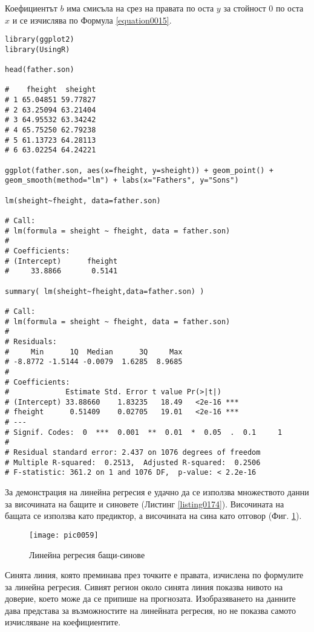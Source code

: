 Коефициентът $b$ има смисъла на срез на правата по оста $y$ за стойност 0 по оста $x$ и се изчислява по Формула \ref{equation0015}. 

\begin{lstlisting}[caption=Линейна регресия, label=listing0174]
library(ggplot2)
library(UsingR)

head(father.son)

#    fheight  sheight
# 1 65.04851 59.77827
# 2 63.25094 63.21404
# 3 64.95532 63.34242
# 4 65.75250 62.79238
# 5 61.13723 64.28113
# 6 63.02254 64.24221

ggplot(father.son, aes(x=fheight, y=sheight)) + geom_point() + geom_smooth(method="lm") + labs(x="Fathers", y="Sons")

lm(sheight~fheight, data=father.son)

# Call:
# lm(formula = sheight ~ fheight, data = father.son)
# 
# Coefficients:
# (Intercept)      fheight  
#     33.8866       0.5141  

summary( lm(sheight~fheight,data=father.son) )

# Call:
# lm(formula = sheight ~ fheight, data = father.son)
# 
# Residuals:
#     Min      1Q  Median      3Q     Max 
# -8.8772 -1.5144 -0.0079  1.6285  8.9685 
# 
# Coefficients:
#             Estimate Std. Error t value Pr(>|t|)    
# (Intercept) 33.88660    1.83235   18.49   <2e-16 ***
# fheight      0.51409    0.02705   19.01   <2e-16 ***
# ---
# Signif. Codes:  0  ***  0.001  **  0.01  *  0.05  .  0.1     1
# 
# Residual standard error: 2.437 on 1076 degrees of freedom
# Multiple R-squared:  0.2513,	Adjusted R-squared:  0.2506 
# F-statistic: 361.2 on 1 and 1076 DF,  p-value: < 2.2e-16
\end{lstlisting}

За демонстрация на линейна регресия е удачно да се използва множеството данни за височината на бащите и синовете (Листинг \ref{listing0174}). Височината на бащата се използва като предиктор, а височината на сина като отговор (Фиг. \ref{figure0059}).

\begin{figure}[h!]
  \centering
  \texttt{[image: pic0059]}
  \caption{Линейна регресия бащи-синове}
\label{figure0059}
\end{figure}
\FloatBarrier

Синята линия, която преминава през точките е правата, изчислена по формулите за линейна регресия. Сивият регион около синята линия показва нивото на доверие, което може да се припише на прогнозата. Изобразяването на данните дава представа за възможностите на линейната регресия, но не показва самото изчисляване на коефициентите. 

